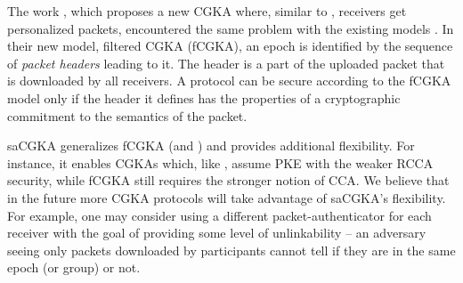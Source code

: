 The work \cite{hashimoto2021cmpke}, which proposes a new CGKA where, similar to \saik, receivers get personalized packets, encountered the same problem with the existing models  \cite{TCC:ACJM20,EPRINT:AlwJosMul20}. In their new model, filtered CGKA (fCGKA), an epoch is identified by the sequence of \emph{packet headers} leading to it. The header is a part of the uploaded packet that is downloaded by all receivers. A protocol can be secure according to the fCGKA model only if the header it defines has the properties of a cryptographic commitment to the semantics of the packet.

saCGKA generalizes fCGKA (and \cite{TCC:ACJM20,EPRINT:AlwJosMul20}) and provides additional flexibility. For instance,
it enables CGKAs which, like \saik, assume PKE with the weaker RCCA security, while fCGKA still requires the stronger
notion of CCA. We believe that in the future more CGKA protocols will take advantage of saCGKA's flexibility. For
example, one may consider using a different packet-authenticator for each receiver with the goal of providing some level of unlinkability -- an adversary seeing only packets downloaded by participants cannot tell if they are in the same epoch (or group) or not.

